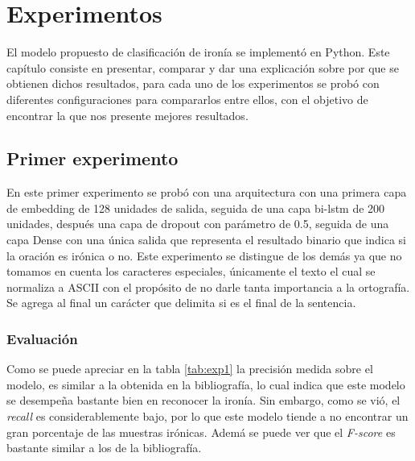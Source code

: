 \chapter{Experimentos}\label{cap.experimentos}


\par El modelo propuesto de clasificación de ironía se implementó en Python. Este capítulo consiste en presentar, comparar y dar una explicación sobre por que se obtienen dichos resultados, para cada uno de los experimentos se probó con diferentes configuraciones para compararlos entre ellos, con el objetivo de encontrar la que nos presente mejores resultados.

\section{Primer experimento}

\par En este primer experimento se probó con una arquitectura con una primera capa de embedding de 128 unidades de salida, seguida de una capa \gls{bi-lstm} de 200 unidades, después una capa de dropout con parámetro de 0.5, seguida de una capa Dense con una única salida que representa el resultado binario que indica si la oración es irónica o no. Este experimento se distingue de los demás ya que no tomamos en cuenta los caracteres especiales, únicamente el texto el cual se normaliza a ASCII con el propósito de no darle tanta importancia a la ortografía. Se agrega al final un carácter que delimita si es el final de la sentencia.

\subsection{Evaluación}
\begin{center}
	
\end{center}

\par Como se puede apreciar en la tabla \ref{tab:exp1} la precisión medida sobre el modelo, es similar a la obtenida en la bibliografía, lo cual indica que este modelo se desempeña bastante bien en reconocer la ironía. Sin embargo, como se vió, el \textit{recall} es considerablemente bajo, por lo que este modelo tiende a no encontrar un gran porcentaje de las muestras irónicas. Ademá se puede ver que el \textit{F-score} es bastante similar a los de la bibliografía.

